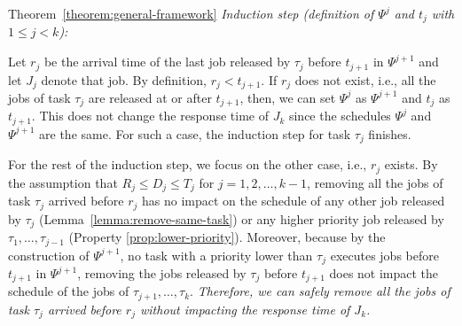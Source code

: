 \begin{appProof}{Theorem~\ref{theorem:general-framework}}
\noindent\textit{Induction step (definition of $\Psi^j$ and $t_j$ with $1 \leq j < k$):}

Let $r_j$ be the arrival time of the last job released by $\tau_j$ before $t_{j+1}$ in $\Psi^{j+1}$ and let $J_{j}$ denote that job. By definition, $r_j < t_{j+1}$. %
If $r_j$ does not exist, i.e., all the jobs of task $\tau_j$ are released at  or after $t_{j+1}$, then, we can set $\Psi^j$ as $\Psi^{j+1}$ and $t_j$ as $t_{j+1}$. This does not change the response time of $J_k$ since the schedules $\Psi^j$ and $\Psi^{j+1}$ are the same. For such a case, the induction step for task $\tau_j$ finishes. 

For the rest of the induction step, we focus on the other case, i.e., $r_j$ exists.
By the assumption that $R_j \leq D_j \leq T_j$ for $j=1,2,\ldots,k-1$, removing all the jobs of task $\tau_j$ arrived before $r_j$ has no impact on the schedule of any other job released by $\tau_j$ (Lemma~\ref{lemma:remove-same-task}) or any higher priority job released by $\tau_1, \ldots, \tau_{j-1}$ (Property \ref{prop:lower-priority}). Moreover, because by the construction of $\Psi^{j+1}$, no task with a priority lower than $\tau_j$ executes jobs before $t_{j+1}$ in $\Psi^{j+1}$, removing the jobs released by $\tau_j$ before $t_{j+1}$ does not impact the schedule of the jobs of $\tau_{j+1}, \ldots, \tau_{k}$. \emph{Therefore, we can safely remove all the jobs of task $\tau_j$ arrived before $r_j$ without impacting the response time of $J_{k}$.}


\end{appProof}
